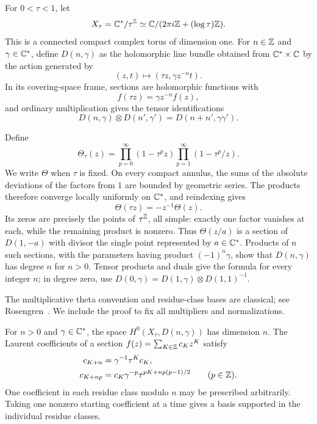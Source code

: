 For $0<\tau<1$, let
\[
 X_\tau=\mathbb C^*/\tau^{\mathbb Z}
   \simeq\mathbb C/(2\pi i\mathbb Z+(\log\tau)\mathbb Z).
\]
This is a connected compact complex torus of dimension one. For
$n\in\mathbb Z$ and $\gamma\in\mathbb C^*$, define $D(n,\gamma)$ as the
holomorphic line bundle obtained from $\mathbb C^*\times\mathbb C$ by the action
generated by
\[
 (z,t)\longmapsto(\tau z,\gamma z^{-n}t).
\]
In its covering-space frame, sections are holomorphic functions with
\[
 f(\tau z)=\gamma z^{-n}f(z),
\]
and ordinary multiplication gives the tensor identifications
\[
 D(n,\gamma)\otimes D(n',\gamma')
   =D(n+n',\gamma\gamma').
\]

Define
\begin{equation}
 \Theta_\tau(z)
 =\prod_{p=0}^{\infty}(1-\tau^p z)
  \prod_{p=1}^{\infty}(1-\tau^p/z).
\label{eq:theta-product}
\end{equation}
We write $\Theta$ when $\tau$ is fixed. On every compact annulus,
the sums of the absolute deviations of the factors from $1$ are
bounded by geometric series. The products therefore converge locally
uniformly on $\mathbb C^*$, and reindexing gives
\[
 \Theta(\tau z)=-z^{-1}\Theta(z).
\]
Its zeros are precisely the points of $\tau^{\mathbb Z}$, all simple:
exactly one factor vanishes at each, while the remaining product is
nonzero. Thus $\Theta(z/a)$ is a section of $D(1,-a)$ with divisor
the single point represented by $a\in\mathbb C^*$. Products of $n$ such
sections, with the parameters having product $(-1)^n\gamma$, show
that $D(n,\gamma)$ has degree $n$ for $n>0$. Tensor products and
duals give the formula for every integer $n$; in degree zero, use
$D(0,\gamma)=D(1,\gamma)\otimes D(1,1)^{-1}$.

The multiplicative theta convention and residue-class bases are classical;
see Rosengren~\cite[arXiv version, Section~1.2 and Exercise~1.6.5]{Rosengren2020}.
We include the proof to fix all multipliers and normalizations.

\begin{lemma}
\label{lem:torus-sections}
For $n>0$ and $\gamma\in\mathbb C^*$, the space
$H^0(X_\tau,D(n,\gamma))$ has dimension $n$. The Laurent
coefficients of a section $f(z)=\sum_{K\in\mathbb Z}c_Kz^K$ satisfy
\begin{equation}
\begin{split}
 c_{K+n}&=\gamma^{-1}\tau^Kc_K,\\
 c_{K+np}&=c_K\gamma^{-p}
       \tau^{pK+np(p-1)/2}\qquad(p\in\mathbb Z).
\end{split}
\label{eq:laurent-recurrence}
\end{equation}
One coefficient in each residue class modulo $n$ may be prescribed
arbitrarily. Taking one nonzero starting coefficient at a time gives
a basis supported in the individual residue classes.
\end{lemma}

